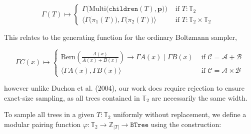\documentclass[portrait,a0b,final,a4resizeable]{a0poster}
\def\jointspacing{\vspace{0.3in}}
\begin{document}
\begin{poster}
\begin{multicols}{2}
      \begin{equation*}
        \Gamma(T) \mapsto \begin{cases}
          \Gamma\Big(\text{Multi} \big(\texttt{children}(T), \mathbf{p}\big)\Big) & \text{ if $T: \mathbb{T}_2$ } \\
          \Big\langle \Gamma\big(\pi_1(T)\big), \Gamma\big(\pi_2(T)\big) \Big\rangle & \text{ if $T: \mathbb{T}_2\times \mathbb{T}_2$ }
        \end{cases}
      \end{equation*}


      \hspace*{2cm}\begin{minipage}[c]{0.90\columnwidth}
      This relates to the generating function for the ordinary Boltzmann sampler,
      \end{minipage}

      \begin{equation*}
        \Gamma C(x) \mapsto \begin{cases}
                              \text{Bern} \left(\frac{A(x)}{A(x) + B(x)}\right) \rightarrow \Gamma A(x) \mid \Gamma B(x) & \text{ if } \mathcal{C}=\mathcal{A}+\mathcal{B} \\
                              \big\langle \Gamma A(x), \Gamma B(x)\big\rangle & \text{ if } \mathcal{C}=\mathcal{A} \times \mathcal{B}
        \end{cases}
      \end{equation*}


      \hspace*{2cm}\begin{minipage}[c]{0.90\columnwidth}
      however unlike Duchon et al. (2004), our work does require rejection to ensure exact-size sampling, as all trees contained in $\mathbb{T}_2$ are necessarily the same width.
      \end{minipage}

      \jointspacing


      \jointspacing

      \hspace*{2cm}\begin{minipage}[c]{0.90\columnwidth}
      To sample all trees in a given $T: \mathbb{T}_2$ uniformly without replacement, we define a modular pairing function $\varphi: \mathbb{T}_2 \rightarrow \mathbb{Z}_{|T|} \rightarrow \texttt{BTree}$ using the construction:
      \end{minipage}


\end{multicols}
\end{poster}
\end{document}
